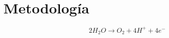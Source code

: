 \chapter{Metodología}


\begin{equation}
\label{eq:electrolisis}
2H_2O \rightarrow O_2 + 4H^+ + 4e^-
\end{equation}

